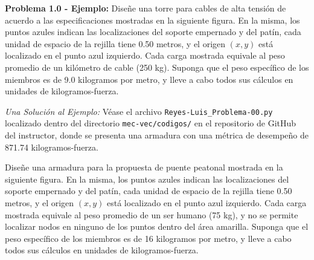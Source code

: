 \documentclass[ a4paper, twoside, 11pt]{article}
\begin{document}
\textbf{Problema 1.0 - Ejemplo:} Dise\~ne una torre para cables de alta tensi\'on de acuerdo a las especificaciones mostradas en la siguiente figura. En la misma, los puntos azules indican las localizaciones del soporte empernado y del pat\'in, cada unidad de espacio de la rejilla tiene 0.50 metros, y el origen $(x,y)$ est\'a localizado en el punto azul izquierdo. Cada carga mostrada equivale al peso promedio de un kil\'ometro de cable (250 kg). Suponga que el peso espec\'ifico de los miembros es de 9.0 kilogramos por metro, y lleve a cabo todos sus c\'alculos en unidades de kilogramos-fuerza. 
\fullskip

\begin{figure}[htb]
\centering
\def\svgwidth{0.3\columnwidth}

\end{figure}
\halfskip

\emph{Una Soluci\'on al Ejemplo:} V\'ease el archivo \texttt{Reyes-Luis\_Problema-00.py} localizado dentro del directorio \texttt{mec-vec/codigos/} en el repositorio de GitHub del instructor, donde se presenta una armadura con una m\'etrica de desempe\~no de 871.74 kilogramos-fuerza. 

\newpage

\begin{problem}

Dise\~ne una armadura para la propuesta de puente peatonal mostrada en la siguiente figura. En la misma, los puntos azules indican las localizaciones del soporte empernado y del pat\'in, cada unidad de espacio de la rejilla tiene 0.50 metros, y el origen $(x,y)$ est\'a localizado en el punto azul izquierdo. Cada carga mostrada equivale al peso promedio de un ser humano (75 kg), y no se permite localizar nodos en ninguno de los puntos dentro del \'area amarilla. Suponga que el peso espec\'ifico de los miembros es de 16 kilogramos por metro, y lleve a cabo todos sus c\'alculos en unidades de kilogramos-fuerza. 
\fullskip

\begin{figure}[htb]
\centering
\def\svgwidth{0.96\columnwidth}

\end{figure}
\halfskip

\end{problem}
\newpage
\end{document}
